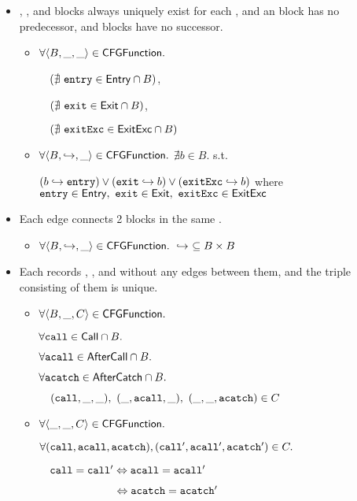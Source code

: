 \begin{itemize}
\item \Entry, \Exit, and \ExitExc blocks always uniquely exist for each \CFGFunction,
and an \Entry block has no predecessor, \Exit and \ExitExc blocks have no successor.
\begin{itemize}
\item $\forall \langle B, \_, \_ \rangle \in \mbox{\textsf{CFGFunction}}.$

$\quad(\nexists\ \mbox{\texttt{entry}} \in\mbox{\textsf{Entry}}\cap B)$,

$\quad(\nexists\ \mbox{\texttt{exit}} \in \mbox{\textsf{Exit}} \cap B)$,

$\quad(\nexists\ \mbox{\texttt{exitExc}} \in \mbox{\textsf{ExitExc}} \cap B)$
\item $\forall \langle B, \hookrightarrow, \_ \rangle \in \mbox{\textsf{CFGFunction}}.$
$\nexists b \in B.$ s.t.

$(b \hookrightarrow \mbox{\texttt{entry}}) \vee (\mbox{\texttt{exit}} \hookrightarrow b) \vee (\mbox{\texttt{exitExc}} \hookrightarrow b)$
where $\mbox{\texttt{entry}} \in \mbox{\textsf{Entry}},\ \mbox{\texttt{exit}} \in \mbox{\textsf{Exit}},\ \mbox{\texttt{exitExc}} \in \mbox{\textsf{ExitExc}}$
\end{itemize}

\item Each edge connects 2 blocks in the same \CFGFunction.
\begin{itemize}
\item $\forall \langle B, \hookrightarrow, \_ \rangle \in \mbox{\textsf{CFGFunction}}.\ \hookrightarrow\ \subseteq B \times B$
\end{itemize}

\item Each \CFGFunction records \Call, \AfterCall, and \AfterCatch
without any edges between them, and the triple consisting of them is unique.
\begin{itemize}
\item $\forall \langle B, \_, C \rangle \in \mbox{\textsf{CFGFunction}}.$

$\forall \call \in \Call \cap B.\ $

$\forall \acall \in \AfterCall \cap B.\ $

$\forall \acatch \in \AfterCatch \cap B.\ $

$\quad(\call, \_, \_),\ (\_, \acall, \_),\ (\_, \_, \acatch) \in C$
\item $\forall \langle \_, \_, C \rangle \in \mbox{\textsf{CFGFunction}}.$

\mbox{$\forall (\mbox{\texttt{call}}, \mbox{\texttt{acall}}, \mbox{\texttt{acatch}}), (\mbox{\texttt{call}}', \mbox{\texttt{acall}}', \mbox{\texttt{acatch}}') \in C.$}

$\quad\mbox{\texttt{call}} = \mbox{\texttt{call}}' \Leftrightarrow \mbox{\texttt{acall}} = \mbox{\texttt{acall}}'$

$\phantom{\quad\call = \call' }\Leftrightarrow \acatch = \acatch'$
\end{itemize}


\end{itemize}
